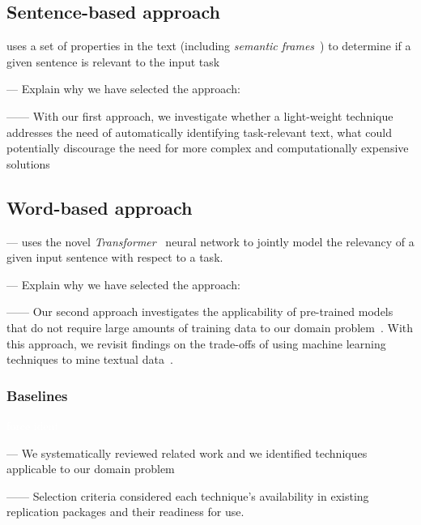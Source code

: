 \subsection{Sentence-based approach}


uses a set of properties in the text (including \textit{semantic frames}~\cite{fillmore1976frame}) to determine if a given sentence is relevant to the input task



--- Explain why we have selected the approach:

------ With our first approach, we investigate whether a light-weight technique addresses the need of automatically identifying task-relevant text, what could potentially discourage the need for more complex and computationally expensive solutions~\cite{Bavota2016}


\subsection{Word-based approach}


--- uses the novel \textit{Transformer}~\cite{Vaswani2017attention} neural network to jointly model the relevancy of a given input sentence with respect to a task. 

--- Explain why we have selected the approach:

------ Our second approach investigates the applicability of pre-trained models that do not require large amounts of training data to our domain problem~\cite{devlin2018bert, Ye2016}. With this approach, we revisit findings on the trade-offs of using machine learning techniques to mine textual data~\cite{Chaparro2017, Bavota2016}.



\clearpage




\subsubsection{Baselines}
\label{cp4:comparison-techniques}
\textcolor{white}{force ident} %

--- We systematically reviewed related work and we identified techniques applicable to our domain problem

------ Selection criteria considered each technique's availability in existing replication packages and their readiness for use.

